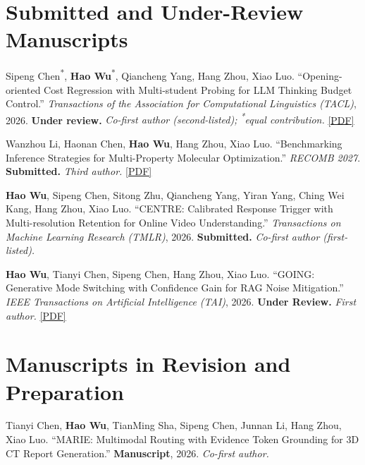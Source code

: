 \documentclass[10pt,a4paper]{article}
\begin{document}
\section{Submitted and Under-Review Manuscripts}
\begin{enumerate}[label={[\arabic*]},start=4]

  \item Sipeng Chen\textsuperscript{*}, \textbf{Hao Wu}\textsuperscript{*}, Qiancheng Yang, Hang Zhou, Xiao Luo.
  \textquotedblleft Opening-oriented Cost Regression with Multi-student Probing for LLM Thinking Budget Control.\textquotedblright{}
  \textit{Transactions of the Association for Computational Linguistics (TACL)}, 2026.
  \textbf{Under review.}
  \textit{Co-first author (second-listed); \textsuperscript{*}equal contribution.}
   \href{https://drive.google.com/file/d/1N_KDhBZMrTO4iVclWG_2Cj6wzYLXt0hl/view?usp=sharing}{[PDF]}
   
  \item Wanzhou Li, Haonan Chen, \textbf{Hao Wu}, Hang Zhou, Xiao Luo.
  \textquotedblleft Benchmarking Inference Strategies for Multi-Property Molecular Optimization.\textquotedblright{}
  \textit{RECOMB 2027}.
  \textbf{Submitted.}
  \textit{Third author.}
  \href{https://drive.google.com/file/d/1vUXBA4xVrCQreoSnoCy_TUq8Q5CLwwDr/view?usp=sharing}{[PDF]}

  \item \textbf{Hao Wu}, Sipeng Chen, Sitong Zhu, Qiancheng Yang, Yiran Yang, Ching Wei Kang, Hang Zhou, Xiao Luo.
  \textquotedblleft CENTRE: Calibrated Response Trigger with Multi-resolution Retention for Online Video Understanding.\textquotedblright{}
  \textit{Transactions on Machine Learning Research (TMLR)}, 2026.
  \textbf{Submitted.}
  \textit{Co-first author (first-listed).}

  \item \textbf{Hao Wu}, Tianyi Chen, Sipeng Chen, Hang Zhou, Xiao Luo.
  \textquotedblleft GOING: Generative Mode Switching with Confidence Gain for RAG Noise Mitigation.\textquotedblright{}
  \textit{IEEE Transactions on Artificial Intelligence (TAI)}, 2026.
  \textbf{Under Review.}
  \textit{First author.}
  \href{https://haowu0916edisonwu.github.io/papers/GOING.pdf}{[PDF]}

\end{enumerate}

\section{Manuscripts in Revision and Preparation}
\begin{enumerate}[label={[\arabic*]},start=8]

  \item Tianyi Chen, \textbf{Hao Wu}, TianMing Sha, Sipeng Chen, Junnan Li, Hang Zhou, Xiao Luo.
  \textquotedblleft MARIE: Multimodal Routing with Evidence Token Grounding for 3D CT Report Generation.\textquotedblright{}
  \textbf{Manuscript}, 2026.
  \textit{Co-first author.}

\end{enumerate}
\end{document}

